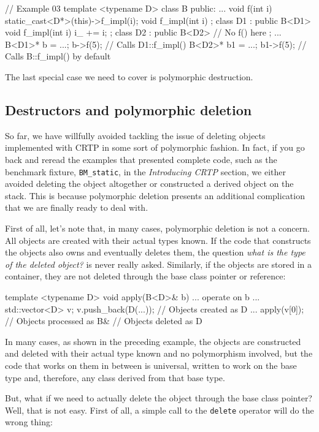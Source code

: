 \begin{code}
// Example 03
template <typename D> class B {
  public:
  ...
  void f(int i) { static_cast<D*>(this)->f_impl(i); }
  void f_impl(int i) {}
};
class D1 : public B<D1> {
  void f_impl(int i) { i_ += i; }
};
class D2 : public B<D2> {
  // No f() here
};
...
B<D1>* b = ...;
b->f(5); // Calls D1::f_impl()
B<D2>* b1 = ...;
b1->f(5); // Calls B::f_impl() by default
\end{code}

The last special case we need to cover is polymorphic destruction.

\subsection{Destructors and polymorphic deletion}

So far, we have willfully avoided tackling the issue of deleting objects implemented with CRTP in some sort of polymorphic fashion. In fact, if you go back and reread the examples that presented complete code, such as the benchmark fixture, \texttt{BM\_static}, in the \emph{Introducing CRTP} section, we either avoided deleting the object altogether or constructed a derived object on the stack. This is because polymorphic deletion presents an additional complication that we are finally ready to deal with.

First of all, let's note that, in many cases, polymorphic deletion is not a concern. All objects are created with their actual types known. If the code that constructs the objects also owns and eventually deletes them, the question \emph{what is the type of the deleted object?} is never really asked. Similarly, if the objects are stored in a container, they are not deleted through the base class pointer or reference:

\begin{code}
template <typename D> void apply(B<D>& b) {
  ... operate on b ...
}
{
  std::vector<D> v;
  v.push_back(D(...)); // Objects created as D
  ...
  apply(v[0]); // Objects processed as B&
} // Objects deleted as D
\end{code}

In many cases, as shown in the preceding example, the objects are constructed and deleted with their actual type known and no polymorphism involved, but the code that works on them in between is universal, written to work on the base type and, therefore, any class derived from that base type.

But, what if we need to actually delete the object through the base class pointer? Well, that is not easy. First of all, a simple call to the \texttt{delete} operator will do the wrong thing:

